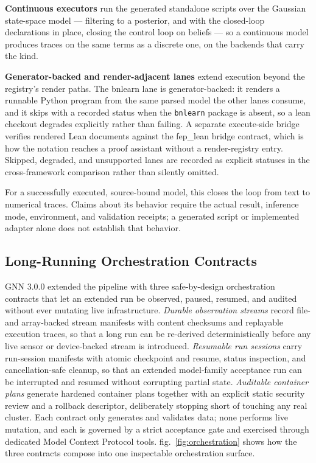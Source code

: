 \documentclass[
  english,
  9pt,
]{extarticle}
\newcounter{none} %
\begin{document}
\textbf{Continuous executors} run the generated standalone scripts over
the Gaussian state-space model --- filtering to a posterior, and with
the closed-loop declarations in place, closing the control loop on
beliefs --- so a continuous model produces traces on the same terms as a
discrete one, on the backends that carry the kind.

\textbf{Generator-backed and render-adjacent lanes} extend execution
beyond the registry's render paths. The bnlearn lane is
generator-backed: it renders a runnable Python program from the same
parsed model the other lanes consume, and it skips with a recorded
status when the \texttt{bnlearn} package is absent, so a lean checkout
degrades explicitly rather than failing. A separate execute-side bridge
verifies rendered Lean documents against the fep\_lean bridge contract,
which is how the notation reaches a proof assistant without a
render-registry entry. Skipped, degraded, and unsupported lanes are
recorded as explicit statuses in the cross-framework comparison rather
than silently omitted.

For a successfully executed, source-bound model, this closes the loop
from text to numerical traces. Claims about its behavior require the
actual result, inference mode, environment, and validation receipts; a
generated script or implemented adapter alone does not establish that
behavior.

\subsection{Long-Running Orchestration
Contracts}\label{long-running-orchestration-contracts}

GNN 3.0.0 extended the pipeline with three safe-by-design orchestration
contracts that let an extended run be observed, paused, resumed, and
audited without ever mutating live infrastructure. \emph{Durable
observation streams} record file- and array-backed stream manifests with
content checksums and replayable execution traces, so that a long run
can be re-derived deterministically before any live sensor or
device-backed stream is introduced. \emph{Resumable run sessions} carry
run-session manifests with atomic checkpoint and resume, status
inspection, and cancellation-safe cleanup, so that an extended
model-family acceptance run can be interrupted and resumed without
corrupting partial state. \emph{Auditable container plans} generate
hardened container plans together with an explicit static security
review and a rollback descriptor, deliberately stopping short of
touching any real cluster. Each contract only generates and validates
data; none performs live mutation, and each is governed by a strict
acceptance gate and exercised through dedicated Model Context Protocol
tools. fig.~\ref{fig:orchestration} shows how the three contracts
compose into one inspectable orchestration surface.
\end{document}

